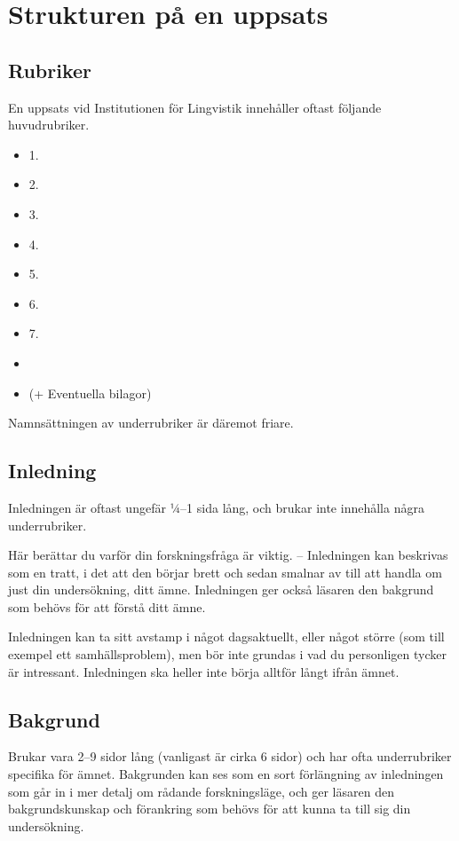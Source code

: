 
\section{Strukturen på en uppsats}
\label{struktur}

\subsection{Rubriker}
\label{rubriker}

En uppsats vid Institutionen för Lingvistik innehåller oftast följande
huvudrubriker.

\begin{itemize}
\item1. 
\item2. 
\item3. 
\item4. 
\item5. 
\item6. 
\item7. 
\item{}
\item (+ Eventuella bilagor)
\end{itemize}

\noindent Namnsättningen av underrubriker är däremot friare.


\subsection{Inledning}
\label{rubrik.inledning}

Inledningen är oftast ungefär ¼--1 sida lång, och brukar inte innehålla några
underrubriker.

Här berättar du varför din forskningsfråga är viktig. – Inledningen kan
beskrivas som en tratt, i det att den börjar brett och sedan smalnar av till
att handla om just din undersökning, ditt ämne. Inledningen ger också läsaren
den bakgrund som behövs för att förstå ditt ämne.

Inledningen kan ta sitt avstamp i något dagsaktuellt, eller något större (som
till exempel ett samhällsproblem), men bör inte grundas i vad du personligen
tycker är intressant. Inledningen ska heller inte börja alltför långt ifrån
ämnet.


\subsection{Bakgrund}
\label{rubrik.bakgrund}

Brukar vara 2--9 sidor lång (vanligast är cirka 6 sidor) och har ofta
underrubriker specifika för ämnet. Bakgrunden kan ses som en sort förlängning
av inledningen som går in i mer detalj om rådande forskningsläge, och ger
läsaren den bakgrundskunskap och förankring som behövs för att kunna ta till
sig din undersökning.

